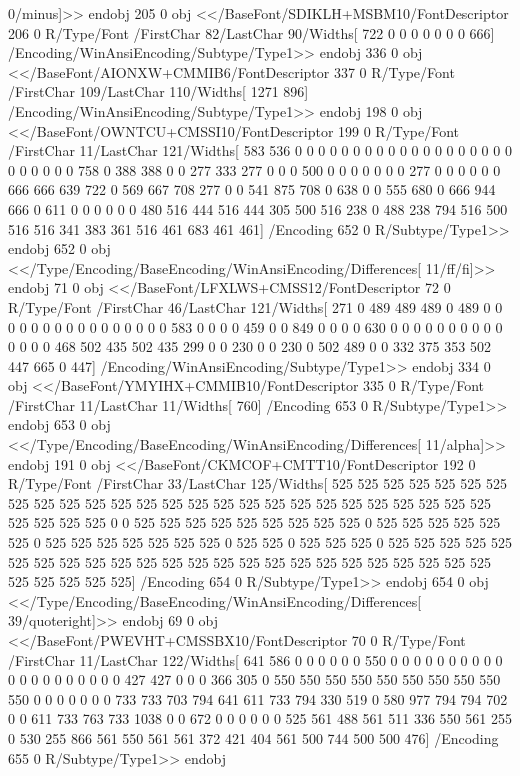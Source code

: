{{{{{{{{{{{{{{{{{{{{{{{{{{{{0/minus]>>
endobj
205 0 obj
<</BaseFont/SDIKLH+MSBM10/FontDescriptor 206 0 R/Type/Font
/FirstChar 82/LastChar 90/Widths[ 722 0 0 0 0 0 0 0 666]
/Encoding/WinAnsiEncoding/Subtype/Type1>>
endobj
336 0 obj
<</BaseFont/AIONXW+CMMIB6/FontDescriptor 337 0 R/Type/Font
/FirstChar 109/LastChar 110/Widths[ 1271 896]
/Encoding/WinAnsiEncoding/Subtype/Type1>>
endobj
198 0 obj
<</BaseFont/OWNTCU+CMSSI10/FontDescriptor 199 0 R/Type/Font
/FirstChar 11/LastChar 121/Widths[ 583 536 0 0 0
0 0 0 0 0 0 0 0 0 0 0 0 0 0 0 0
0 0 0 0 0 0 758 0 388 388 0 0 277 333 277 0
0 0 500 0 0 0 0 0 0 0 277 0 0 0 0 0
0 666 666 639 722 0 569 667 708 277 0 0 541 875 708 0
638 0 0 555 680 0 666 944 666 0 611 0 0 0 0 0
0 480 516 444 516 444 305 500 516 238 0 488 238 794 516 500
516 516 341 383 361 516 461 683 461 461]
/Encoding 652 0 R/Subtype/Type1>>
endobj
652 0 obj
<</Type/Encoding/BaseEncoding/WinAnsiEncoding/Differences[
11/ff/fi]>>
endobj
71 0 obj
<</BaseFont/LFXLWS+CMSS12/FontDescriptor 72 0 R/Type/Font
/FirstChar 46/LastChar 121/Widths[ 271 0
489 489 489 0 489 0 0 0 0 0 0 0 0 0 0 0
0 0 0 0 0 583 0 0 0 0 459 0 0 849 0 0
0 0 630 0 0 0 0 0 0 0 0 0 0 0 0 0
0 468 502 435 502 435 299 0 0 230 0 0 230 0 502 489
0 0 332 375 353 502 447 665 0 447]
/Encoding/WinAnsiEncoding/Subtype/Type1>>
endobj
334 0 obj
<</BaseFont/YMYIHX+CMMIB10/FontDescriptor 335 0 R/Type/Font
/FirstChar 11/LastChar 11/Widths[ 760]
/Encoding 653 0 R/Subtype/Type1>>
endobj
653 0 obj
<</Type/Encoding/BaseEncoding/WinAnsiEncoding/Differences[
11/alpha]>>
endobj
191 0 obj
<</BaseFont/CKMCOF+CMTT10/FontDescriptor 192 0 R/Type/Font
/FirstChar 33/LastChar 125/Widths[ 525 525 525 525 525 525 525 525 525 525 525 525 525 525 525
525 525 525 525 525 525 525 525 525 525 525 525 525 525 525 0
0 525 525 525 525 525 525 525 525 525 0 525 525 525 525 525
525 0 525 525 525 525 525 525 525 0 525 525 0 525 525 525
0 525 525 525 525 525 525 525 525 525 525 525 525 525 525 525
525 525 525 525 525 525 525 525 525 525 525 525 525 525]
/Encoding 654 0 R/Subtype/Type1>>
endobj
654 0 obj
<</Type/Encoding/BaseEncoding/WinAnsiEncoding/Differences[
39/quoteright]>>
endobj
69 0 obj
<</BaseFont/PWEVHT+CMSSBX10/FontDescriptor 70 0 R/Type/Font
/FirstChar 11/LastChar 122/Widths[ 641 586 0 0 0
0 0 0 550 0 0 0 0 0 0 0 0 0 0 0 0
0 0 0 0 0 0 0 0 427 427 0 0 0 366 305 0
550 550 550 550 550 550 550 550 550 550 0 0 0 0 0 0
0 733 733 703 794 641 611 733 794 330 519 0 580 977 794 794
702 0 0 611 733 763 733 1038 0 0 672 0 0 0 0 0
0 525 561 488 561 511 336 550 561 255 0 530 255 866 561 550
561 561 372 421 404 561 500 744 500 500 476]
/Encoding 655 0 R/Subtype/Type1>>
endobj
}}}}}}}}}}}}}}}}}}}}}}}}}}}}
